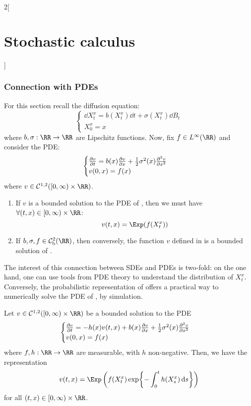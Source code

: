 \documentclass[../../../main_math.tex]{subfiles}
\begin{document}
\begin{multicols}{2}[\section{Stochastic calculus}]
  \subsubsection{Connection with PDEs}
  For this section recall the diffusion equation:
  \begin{equation}\label{SC:sde_pde}
    \begin{cases}
      \dd{X_t^x}=b(X_t^x)\dd{t}+\sigma(X_t^x)\dd{B_t} \\
      X_0^x=x
    \end{cases}
  \end{equation}
  where $b,\sigma:\RR\to\RR$ are Lipschitz functions. Now, fix $f\in L^\infty(\RR)$ and consider the PDE:
  \begin{equation}\label{SC:pde_sde}
    \begin{cases}
      \pdv{v}{t}(t,x)=b(x)\pdv{v}{x}(t,x)+\frac{1}{2}\sigma^2(x)\pdv[2]{v}{x}(t,x) \\
      v(0,x)=f(x)
    \end{cases}
  \end{equation}
  where $v\in \mathcal{C}^{1,2}([0,\infty)\times\RR)$.
  \begin{theorem}\hfill
    \begin{enumerate}
      \item If $v$ is a bounded solution to the PDE of , then we must have $\forall (t,x)\in [0,\infty)\times\RR$:
            \begin{equation}\label{SC:sol_v}
              v(t,x)=\Exp(f(X_t^x))
            \end{equation}
      \item If $b,\sigma, f\in \mathcal{C}_\text{b}^2(\RR)$, then conversely, the function $v$ defined in  is a bounded solution of .
    \end{enumerate}
  \end{theorem}
  \begin{remark}
    The interest of this connection between SDEs and PDEs is two-fold: on the one hand, one can use tools from PDE theory to understand the distribution of $X_t^x$. Conversely, the probabilistic representation of  offers a practical way to numerically solve the PDE of , by simulation.
  \end{remark}
  \begin{theorem}\label{SC:feynman_kac}
    Let $v\in \mathcal{C}^{1,2}([0,\infty)\times\RR)$ be a bounded solution to the PDE
    $$
      \begin{cases}
        \pdv{v}{t}(t,x)=-h(x)v(t,x)+b(x) \pdv{v}{x}(t,x)+\frac{1}{2}\sigma^2(x)\pdv[2]{v}{x}(t,x) \\
        v(0,x)=f(x)
      \end{cases}
    $$
    where $f,h:\RR\to\RR$ are measurable, with $h$ non-negative. Then, we have the representation
    $$
      v(t,x)=\Exp\left(f(X_t^x)\exp{-\int_0^t h(X_s^x)\dd{s}}\right)
    $$
    for all $(t,x)\in [0,\infty)\times\RR$.
  \end{theorem}
\end{multicols}
\end{document}
